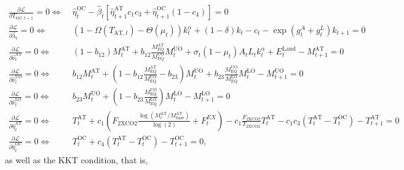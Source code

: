 \documentclass[11pt, a4paper, pdftex, twoside, dvipsnames]{article}
\begin{document}
\begin{appendices}
\begin{align}
\label{eq:CDICE_foc_TOC}
\frac{\partial \mathcal{L}}{\partial T_{\text{OC},t+1}}=0
      \Leftrightarrow & \; \hat{\eta}_t^{\text{OC}} - \hat{\beta}_t \left[\hat{\eta}_{t+1}^{\text{AT}}  c_1 c_{3}  +  \hat{\eta}_{t+1}^{\text{OC}}  (1 - c_{4})\right]= 0 \\
    \label{eq:CDICE_foc_lambda}
  \frac{\partial \mathcal{L}}{\partial \hat{\lambda}_{t}}=0
      \Leftrightarrow & \; \left(1 - \Omega\left(T_{\text{AT},t}\right)-\Theta\left(\mu_{t}\right)\right)k_{t}^{\alpha}
    + \left(1-\delta\right)k_{t}
    - c_{t}  - \exp\left(g^{A}_{t}+g^{L}_{t}\right)k_{t+1} = 0 \\
    \label{eq:CDICE_foc_nuAT}
  \frac{\partial \mathcal{L}}{\partial \hat{\nu}_t^{\text{AT}}}=0
      \Leftrightarrow & \; \left(1 - b_{12} \right) M^{\text{AT}}_{t} + b_{12} \frac{M^{\text{AT}}_{\text{EQ}}}{M^{\text{UO}}_{\text{EQ}}} M^{\text{UO}}_{t} +   \sigma_t (1-\mu_t) A_{t}L_{t}k_{t}^{\alpha}  + E^{\text{Land}}_t - M^{\text{AT}}_{t+1} = 0 \\
    \label{eq:CDICE_foc_nuUO}
  \frac{\partial \mathcal{L}}{\partial \hat{\nu}_t^{\text{UO}}}=0
      \Leftrightarrow & \; b_{12}M^{\text{AT}}_{t} + \left(1 - b_{12} \frac{M^{\text{AT}}_{\text{EQ}}}{M^{\text{UO}}_{\text{EQ}}} - b_{23}\right)M^{\text{UO}}_{t} + b_{23} \frac{M^{\text{UO}}_{\text{EQ}}}{M^{\text{LO}}_{\text{EQ}}} M^{\text{LO}}_{t} - M^{\text{UO}}_{t+1} = 0 \\
    \label{eq:CDICE_foc_nuLO}
  \frac{\partial \mathcal{L}}{\partial \hat{\nu}_t^{\text{LO}}}=0
      \Leftrightarrow & \; b_{23}M^{\text{UO}}_{t} + \left(1 - b_{23} \frac{M^{\text{UO}}_{\text{EQ}}}{M^{\text{LO}}_{\text{EQ}}} \right)M^{\text{LO}}_{t} - M^{\text{LO}}_{t+1} = 0 \\
    \label{eq:CDICE_foc_etaAT}
  \frac{\partial \mathcal{L}}{\partial \hat{\eta}_t^{\text{AT}}}=0
      \Leftrightarrow & \; T^{\text{AT}}_{t} + c_1 \left(F_{\text{2XCO2}} \frac{\log(M^{\text{AT}}_{t}/M^{\text{AT}}_{\text{base}})}{\log(2)} + F^{EX}_{t} \right)  - c_1 \frac{F_{\text{2XCO2}}}{T_{\text{2XCO2}}}T^{\text{AT}}_{t}- c_1c_3 \left(T^{\text{AT}}_{t}-T^{\text{OC}}_{t}\right) - T^{\text{AT}}_{t+1} = 0 \\
    \label{eq:CDICE_foc_etaOC}
  \frac{\partial \mathcal{L}}{\partial \hat{\eta}_t^{\text{OC}}}=0
      \Leftrightarrow & \; T^{\text{OC}}_{t} + c_4 \left(T^{\text{AT}}_{t}  - T^{\text{OC}}_{t}\right) - T^{\text{OC}}_{t+1} = 0, 
\end{align}
%
as well as the KKT condition, that is,
\begin{align}

\end{align}
\end{appendices}
\end{document}
